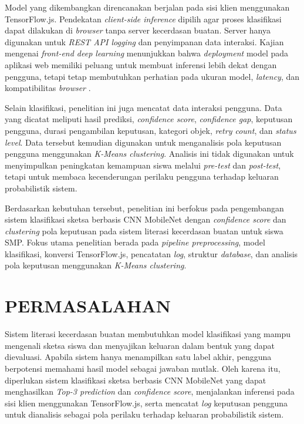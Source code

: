 \documentclass[12pt,a4paper,oneside,openany]{report}
\begin{document}
Model yang dikembangkan direncanakan berjalan pada sisi klien menggunakan TensorFlow.js. Pendekatan \textit{client-side inference} dipilih agar proses klasifikasi dapat dilakukan di \textit{browser} tanpa server kecerdasan buatan. Server hanya digunakan untuk \textit{REST API logging} dan penyimpanan data interaksi. Kajian mengenai \textit{front-end deep learning} menunjukkan bahwa \textit{deployment} model pada aplikasi web memiliki peluang untuk membuat inferensi lebih dekat dengan pengguna, tetapi tetap membutuhkan perhatian pada ukuran model, \textit{latency}, dan kompatibilitas \textit{browser} \cite{ref7}.

Selain klasifikasi, penelitian ini juga mencatat data interaksi pengguna. Data yang dicatat meliputi hasil prediksi, \textit{confidence score}, \textit{confidence gap}, keputusan pengguna, durasi pengambilan keputusan, kategori objek, \textit{retry count}, dan \textit{status level}. Data tersebut kemudian digunakan untuk menganalisis pola keputusan pengguna menggunakan \textit{K-Means clustering}. Analisis ini tidak digunakan untuk menyimpulkan peningkatan kemampuan siswa melalui \textit{pre-test} dan \textit{post-test}, tetapi untuk membaca kecenderungan perilaku pengguna terhadap keluaran probabilistik sistem.

Berdasarkan kebutuhan tersebut, penelitian ini berfokus pada pengembangan sistem klasifikasi sketsa berbasis CNN MobileNet dengan \textit{confidence score} dan \textit{clustering} pola keputusan pada sistem literasi kecerdasan buatan untuk siswa SMP. Fokus utama penelitian berada pada \textit{pipeline preprocessing}, model klasifikasi, konversi TensorFlow.js, pencatatan \textit{log}, struktur \textit{database}, dan analisis pola keputusan menggunakan \textit{K-Means clustering}.

\section{PERMASALAHAN}
\label{sec:permasalahan}

Sistem literasi kecerdasan buatan membutuhkan model klasifikasi yang mampu mengenali sketsa siswa dan menyajikan keluaran dalam bentuk yang dapat dievaluasi. Apabila sistem hanya menampilkan satu label akhir, pengguna berpotensi memahami hasil model sebagai jawaban mutlak. Oleh karena itu, diperlukan sistem klasifikasi sketsa berbasis CNN MobileNet yang dapat menghasilkan \textit{Top-3 prediction} dan \textit{confidence score}, menjalankan inferensi pada sisi klien menggunakan TensorFlow.js, serta mencatat \textit{log} keputusan pengguna untuk dianalisis sebagai pola perilaku terhadap keluaran probabilistik sistem.
\end{document}
